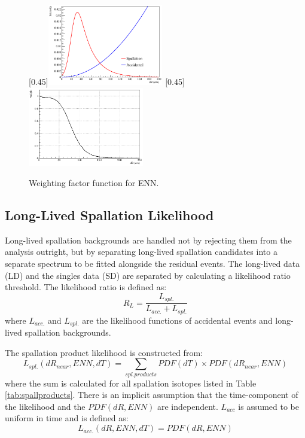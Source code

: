 \begin{figure}[htbp]
	\centering
	[0.45\textwidth]{\includegraphics[width=0.45\textwidth]{spall_dR.png}}
	\hfill
	[0.45\textwidth]{\includegraphics[width=0.45\textwidth]{ENN_dR.png}}
	\caption{Weighting factor function for ENN.}
	\label{fig:ENN_dR}
\end{figure}

\subsection*{Long-Lived Spallation Likelihood}
Long-lived spallation backgrounds are handled not by rejecting them from the analysis outright, but by separating long-lived spallation candidates into a separate spectrum to be fitted alongside the residual events. The long-lived data (LD) and the singles data (SD) are separated by calculating a likelihood ratio threshold. The likelihood ratio is defined as:
\begin{equation}
	R_L=\frac{L_{spl.}}{L_{acc.}+L_{spl.}}
\end{equation}
where $L_{acc.}$ and $L_{spl.}$ are the likelihood functions of accidental events and long-lived spallation backgrounds.

The spallation product likelihood is constructed from:
\begin{equation}
	L_{spl.}(dR_{near}, ENN, dT)=\sum_{spl. products}PDF(dT)\times PDF(dR_{near}, ENN)
\end{equation}
where the sum is calculated for all spallation isotopes listed in Table \ref{tab:spallproducts}. There is an implicit assumption that the time-component of the likelihood and the $PDF(dR, ENN)$ are independent. $L_{acc}$ is assumed to be uniform in time and is defined as:
\begin{equation}
	L_{acc.}(dR, ENN, dT) = PDF(dR, ENN)
\end{equation}

